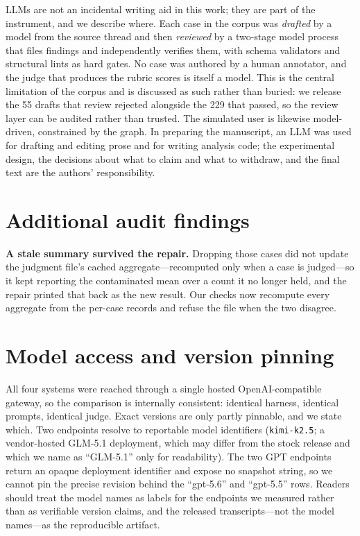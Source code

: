 \documentclass{article} %
\begin{document}
LLMs are not an incidental writing aid in this work; they are part of the
instrument, and we describe where. Each case in the corpus was
\emph{drafted} by a model from the source thread and then \emph{reviewed}
by a two-stage model process that files findings and independently
verifies them, with schema validators and structural lints as hard gates.
No case was authored by a human annotator, and the judge that produces
the rubric scores is itself a model. This is the central limitation of
the corpus and is discussed as such rather than buried: we release the 55
drafts that review rejected alongside the 229 that passed, so the review
layer can be audited rather than trusted. The simulated user is likewise
model-driven, constrained by the graph. In preparing the manuscript, an
LLM was used for drafting and editing prose and for writing analysis
code; the experimental design, the decisions about what to claim and what
to withdraw, and the final text are the authors' responsibility.




\appendix
\section{Additional audit findings}
\label{app:audit}

\textbf{A stale summary survived the repair.} Dropping those cases did
not update the judgment file's cached aggregate---recomputed only when a
case is judged---so it kept reporting the contaminated mean over a count
it no longer held, and the repair printed that back as the new result.
Our checks now recompute every aggregate from the per-case records and
refuse the file when the two disagree.

\section{Model access and version pinning}
\label{sec:access}

All four systems were reached through a single hosted OpenAI-compatible
gateway, so the comparison is internally consistent: identical harness,
identical prompts, identical judge. Exact versions are only partly
pinnable, and we state which. Two endpoints resolve to reportable model
identifiers (\texttt{kimi-k2.5}; a vendor-hosted GLM-5.1 deployment,
which may differ from the stock release and which we name as
``GLM-5.1'' only for readability). The two GPT endpoints return an
opaque deployment identifier and expose no snapshot string, so we cannot
pin the precise revision behind the ``gpt-5.6'' and ``gpt-5.5'' rows.
Readers should treat the model names as labels for the endpoints we
measured rather than as verifiable version claims, and the released
transcripts---not the model names---as the reproducible artifact.
\end{document}
